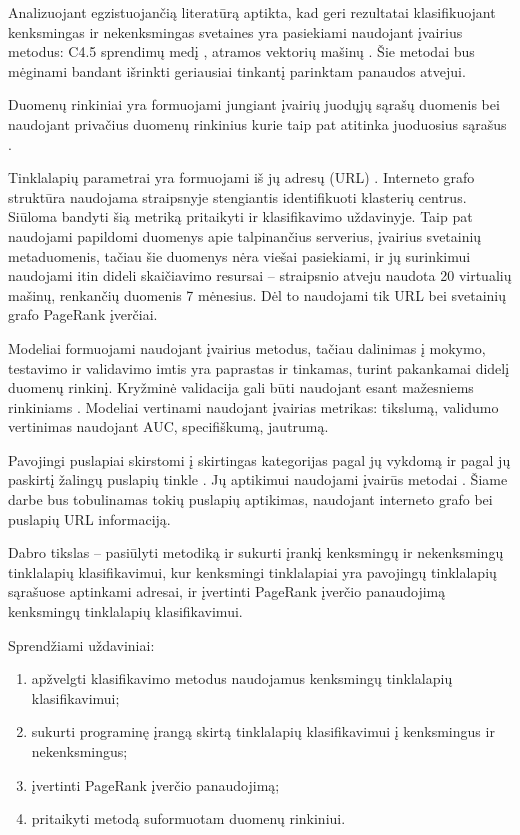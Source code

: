 Analizuojant egzistuojančią literatūrą aptikta, kad geri rezultatai klasifikuojant kenksmingas ir nekenksmingas svetaines yra pasiekiami naudojant įvairius metodus: C4.5 sprendimų medį \cite{trees}, atramos vektorių mašinų \cite{comp}. Šie metodai bus mėginami bandant išrinkti geriausiai tinkantį parinktam panaudos atvejui.

Duomenų rinkiniai yra formuojami jungiant įvairių juodųjų sąrašų duomenis bei naudojant privačius duomenų rinkinius kurie taip pat atitinka juoduosius sąrašus \cite{trees, comp, webcop}.

Tinklalapių parametrai yra formuojami iš jų adresų (URL) \cite{trees, comp}. Interneto grafo struktūra naudojama straipsnyje \cite{linchpins} stengiantis identifikuoti klasterių centrus. Siūloma bandyti šią metriką pritaikyti ir klasifikavimo uždavinyje. Taip pat naudojami papildomi duomenys apie talpinančius serverius, įvairius svetainių metaduomenis, tačiau šie duomenys nėra viešai pasiekiami, ir jų surinkimui naudojami itin dideli skaičiavimo resursai -- \cite{linchpins} straipsnio atveju naudota 20 virtualių mašinų, renkančių duomenis 7 mėnesius. Dėl to naudojami tik URL bei svetainių grafo PageRank įverčiai.

Modeliai formuojami naudojant įvairius metodus, tačiau dalinimas į mokymo, testavimo ir validavimo imtis yra paprastas ir tinkamas, turint pakankamai didelį duomenų rinkinį. Kryžminė validacija gali būti naudojant esant mažesniems rinkiniams \cite{trees}. Modeliai vertinami naudojant įvairias metrikas: tikslumą, validumo vertinimas naudojant AUC, specifiškumą, jautrumą.

\newpage
{}
Pavojingi puslapiai skirstomi į skirtingas kategorijas pagal jų vykdomą \cite{tax} ir pagal jų paskirtį žalingų puslapių tinkle \cite{linchpins}. Jų aptikimui naudojami įvairūs metodai \cite{comp}. Šiame darbe bus tobulinamas tokių puslapių aptikimas, naudojant interneto grafo bei puslapių URL informaciją.

Dabro tikslas -- pasiūlyti metodiką ir sukurti įrankį kenksmingų ir nekenksmingų tinklalapių klasifikavimui, kur kenksmingi tinklalapiai yra pavojingų tinklalapių sąrašuose aptinkami adresai, ir įvertinti PageRank įverčio panaudojimą kenksmingų tinklalapių klasifikavimui.

Sprendžiami uždaviniai:
\begin{enumerate}
    \item apžvelgti klasifikavimo metodus naudojamus kenksmingų tinklalapių klasifikavimui;
    \item sukurti programinę įrangą skirtą tinklalapių klasifikavimui į kenksmingus ir nekenksmingus;
    \item įvertinti PageRank įverčio panaudojimą;
    \item pritaikyti metodą suformuotam duomenų rinkiniui.
\end{enumerate}
